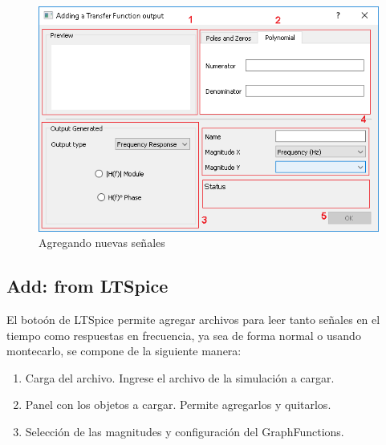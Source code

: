 \documentclass[a4paper,10pt]{article}
\begin{document}
\begin{figure}[H]
\begin{center}
	\includegraphics[scale=0.8]{resources/transfer_dialog.png}
	\caption{Agregando nuevas se\~nales}
\end{center}
\end{figure}

\subsection{Add: from LTSpice}
El boto\'on de LTSpice permite agregar archivos para leer tanto se\~nales en el tiempo como respuestas en frecuencia,
ya sea de forma normal o usando montecarlo, se compone de la siguiente manera:
\begin{enumerate}
	\item Carga del archivo. Ingrese el archivo de la simulaci\'on a cargar.
	\item Panel con los objetos a cargar. Permite agregarlos y quitarlos.
	\item Selecci\'on de las magnitudes y configuraci\'on del GraphFunctions.
\end{enumerate}
\end{document}
